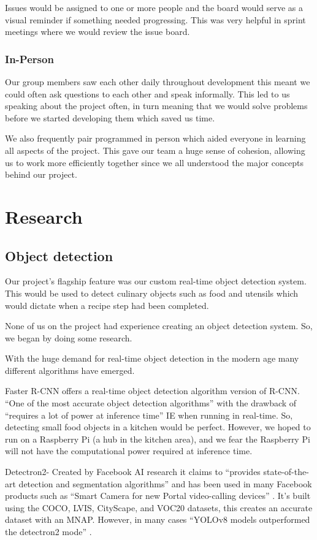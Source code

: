 \documentclass{article}
\begin{document}
Issues would be assigned to one or more people and the board would serve as a visual reminder if something needed progressing. This was very helpful in sprint meetings where we would review the issue board.

\subsubsection{In-Person}
Our group members saw each other daily throughout development this meant we could often ask questions to each other and speak informally. This led to us speaking about the project often, in turn meaning that we would solve problems before we started developing them which saved us time.

We also frequently pair programmed in person which aided everyone in learning all aspects of the project. This gave our team a huge sense of cohesion, allowing us to work more efficiently together since we all understood the major concepts behind our project.

\section{Research}
\subsection{Object detection}
Our project's flagship feature was our custom real-time object detection system. This would be used to detect culinary objects such as food and utensils which would dictate when a recipe step had been completed.

None of us on the project had experience creating an object detection system. So, we began by doing some research.

With the huge demand for real-time object detection in the modern age many different algorithms have emerged.

Faster R-CNN offers a real-time object detection algorithm version of R-CNN. “One of the most accurate object detection algorithms” \cite{FasterRCNN} with the drawback of “requires a lot of power at inference time” IE when running in real-time. So, detecting small food objects in a kitchen would be perfect. However, we hoped to run on a Raspberry Pi (a hub in the kitchen area), and we fear the Raspberry Pi will not have the computational power required \cite{Fast-CNN-Rasberry-Pi} at inference time.

Detectron2- Created by Facebook AI research it claims to “provides state-of-the-art detection and segmentation algorithms” \cite{wu2019detectron2} and has been used in many Facebook products such as “Smart Camera for new Portal video-calling devices” \cite{metasmartcameras}. It’s built using the COCO, LVIS, CityScape, and VOC20 datasets, this creates an accurate dataset with an MNAP. However, in many cases “YOLOv8 models outperformed the detectron2 mode” \cite{ai5010005}.
\end{document}
